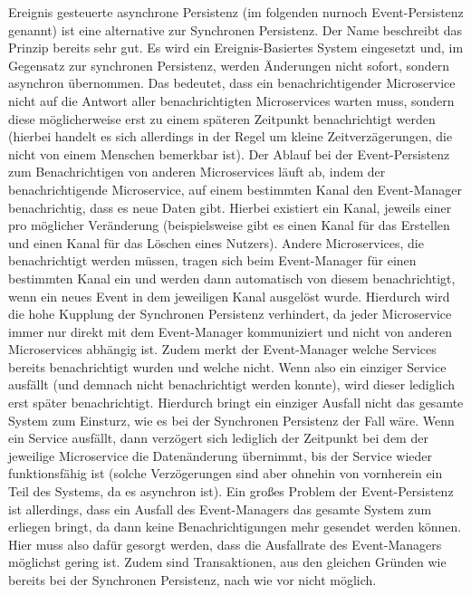 Ereignis gesteuerte asynchrone Persistenz (im folgenden nurnoch Event-Persistenz genannt) ist eine alternative zur Synchronen Persistenz. Der Name beschreibt das Prinzip bereits sehr gut. Es wird ein Ereignis-Basiertes System eingesetzt und, im Gegensatz zur synchronen Persistenz, werden Änderungen nicht sofort, sondern asynchron übernommen. Das bedeutet, dass ein benachrichtigender Microservice nicht auf die Antwort aller benachrichtigten Microservices warten muss, sondern diese möglicherweise erst zu einem späteren Zeitpunkt benachrichtigt werden (hierbei handelt es sich allerdings in der Regel um kleine Zeitverzägerungen, die nicht von einem Menschen bemerkbar ist).
Der Ablauf bei der Event-Persistenz zum Benachrichtigen von anderen Microservices läuft ab, indem der benachrichtigende Microservice, auf einem bestimmten Kanal den Event-Manager benachrichtig, dass es neue Daten gibt. Hierbei existiert ein Kanal, jeweils einer pro möglicher Veränderung (beispielsweise gibt es einen Kanal für das Erstellen und einen Kanal für das Löschen eines Nutzers). Andere Microservices, die benachrichtigt werden müssen, tragen sich beim Event-Manager für einen bestimmten Kanal ein und werden dann automatisch von diesem benachrichtigt, wenn ein neues Event in dem jeweiligen Kanal ausgelöst wurde.
Hierdurch wird die hohe Kupplung der Synchronen Persistenz verhindert, da jeder Microservice immer nur direkt mit dem Event-Manager kommuniziert und nicht von anderen Microservices abhängig ist. Zudem merkt der Event-Manager welche Services bereits benachrichtigt wurden und welche nicht. Wenn also ein einziger Service ausfällt (und demnach nicht benachrichtigt werden konnte), wird dieser lediglich erst später benachrichtigt. Hierdurch bringt ein einziger Ausfall nicht das gesamte System zum Einsturz, wie es bei der Synchronen Persistenz der Fall wäre. Wenn ein Service ausfällt, dann verzögert sich lediglich der Zeitpunkt bei dem der jeweilige Microservice die Datenänderung übernimmt, bis der Service wieder funktionsfähig ist (solche Verzögerungen sind aber ohnehin von vornherein ein Teil des Systems, da es asynchron ist).
Ein großes Problem der Event-Persistenz ist allerdings, dass ein Ausfall des Event-Managers das gesamte System zum erliegen bringt, da dann keine Benachrichtigungen mehr gesendet werden können. Hier muss also dafür gesorgt werden, dass die Ausfallrate des Event-Managers möglichst gering ist. 
Zudem sind Transaktionen, aus den gleichen Gründen wie bereits bei der Synchronen Persistenz, nach wie vor nicht möglich.\cite{eventual_persitence}

